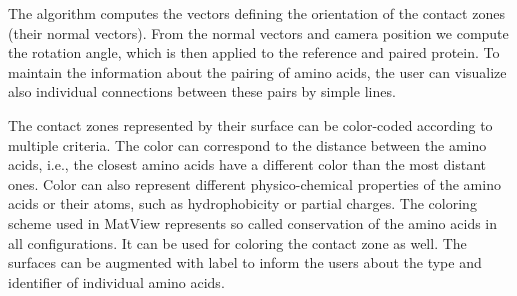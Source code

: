 \documentclass{bmcart}
\begin{document}
The algorithm computes the vectors defining the orientation of the contact zones (their normal vectors). 
From the normal vectors and camera position we compute the rotation angle, which is then applied to the reference and paired protein.
To maintain the information about the pairing of amino acids, the user can visualize also individual connections between these pairs by simple lines.


The contact zones represented by their surface can be color-coded according to multiple criteria.
The color can correspond to the distance between the amino acids, i.e., the closest amino acids have a different color than the most distant ones.
Color can also represent different physico-chemical properties of the amino acids or their atoms, such as hydrophobicity or partial charges.
The coloring scheme used in MatView represents so called conservation of the amino acids in all configurations.
It can be used for coloring the contact zone as well.
The surfaces can be augmented with label to inform the users about the type and identifier of individual amino acids.
\end{document}
